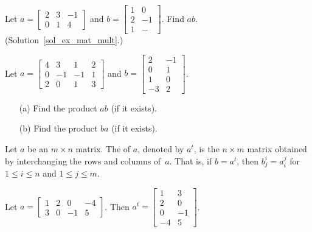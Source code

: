 \begin{exer}\label{ex_mat_mult} Let $a = \begin{bmatrix} 2 & 3 & -1 \\ 0 & 1 & 4 \end{bmatrix}$
and $b = \begin{bmatrix} 1 & 0 \\ 2 & -1 \\ 1 & -\end{bmatrix}$.  Find $ab$.
(Solution~\ref{sol_ex_mat_mult}.)
\end{exer}

\begin{prob} Let $a = \begin{bmatrix}
                            4 &  3 &  1 &  2 \\
                            0 & -1 & -1 &  1 \\
                            2 &  0 &  1 &  3
                      \end{bmatrix}$
and $b = \begin{bmatrix}
                   2 & -1 \\
                   0 &  1 \\
                   1 &  0 \\
                  -3 &  2
         \end{bmatrix}$.
 \begin{enumerate}
  \item[(a)] Find the product $ab$ (if it exists).
  \item[(b)] Find the product $ba$ (if it exists).
 \end{enumerate}
\end{prob}

\begin{defn} Let $a$ be an $m \times n$ matrix.  The
 of $a$, denoted by $a^t$, is the $n \times m$ matrix obtained by interchanging
the rows and columns of~$a$.  That is, if $b = a^t$, then $b_j^i = a_i^j$ for $1 \le i \le n$
and $1 \le j \le  m$.
\end{defn}

\begin{exam} Let $a =  \begin{bmatrix}
                            1 &  2 &  0 & -4 \\
                            3 &  0 & -1 &  5
                       \end{bmatrix}$.  Then
$a^t = \begin{bmatrix}
               1 &  3 \\
               2 &  0 \\
               0 & -1 \\
              -4 &  5
       \end{bmatrix}$.
\end{exam}

